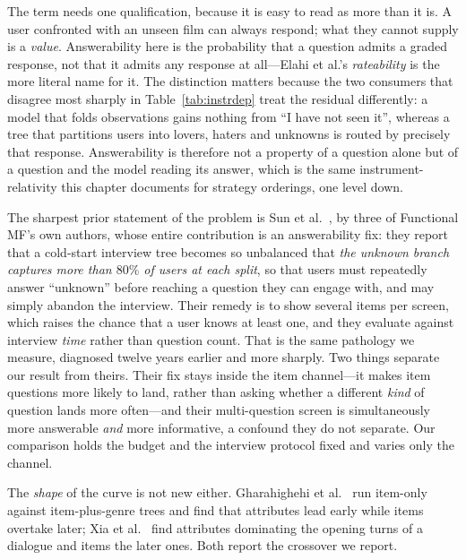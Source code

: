 \documentclass[11pt]{article}
\begin{document}
The term needs one qualification, because it is easy to read as more than it is. A user confronted with an
unseen film can always respond; what they cannot supply is a \emph{value}. Answerability here is the
probability that a question admits a graded response, not that it admits any response at all---Elahi et
al.'s \emph{rateability} is the more literal name for it. The distinction matters because the two consumers
that disagree most sharply in Table~\ref{tab:instrdep} treat the residual differently: a model that folds
observations gains nothing from ``I have not seen it'', whereas a tree that partitions users into lovers,
haters and unknowns is routed by precisely that response. Answerability is therefore not a property of a
question alone but of a question and the model reading its answer, which is the same
instrument-relativity this chapter documents for strategy orderings, one level down.

The sharpest prior statement of the problem is Sun et al.~\cite{sun2013learning}, by three of Functional
MF's own authors, whose entire contribution is an answerability fix: they report that a cold-start
interview tree becomes so unbalanced that \emph{the unknown branch captures more than $80\%$ of users at
each split}, so that users must repeatedly answer ``unknown'' before reaching a question they can engage
with, and may simply abandon the interview. Their remedy is to show several items per screen, which raises
the chance that a user knows at least one, and they evaluate against interview \emph{time} rather than
question count. That is the same pathology we measure, diagnosed twelve years earlier and more sharply.
Two things separate our result from theirs. Their fix stays inside the item channel---it makes item
questions more likely to land, rather than asking whether a different \emph{kind} of question lands more
often---and their multi-question screen is simultaneously more answerable \emph{and} more informative, a
confound they do not separate. Our comparison holds the budget and the interview protocol fixed and varies
only the channel.

The \emph{shape} of the curve is not new either. Gharahighehi et
al.~\cite{gharahighehi2025pairwise} run item-only against item-plus-genre trees and find that attributes
lead early while items overtake later; Xia et al.~\cite{xia2026when} find attributes dominating the
opening turns of a dialogue and items the later ones. Both report the crossover we report.
\end{document}
